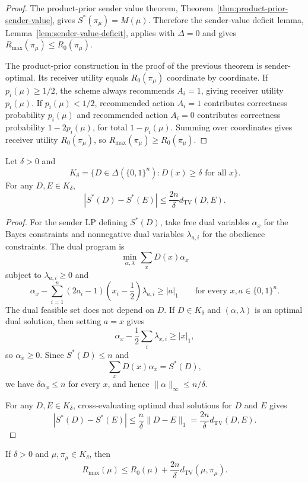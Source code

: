 \documentclass[format=acmsmall, review=false]{acmart}
\newcommand{\TV}{d_{\mathrm{TV}}}
\begin{document}
\begin{proof}
The product-prior sender value theorem,
Theorem~\ref{thm:product-prior-sender-value}, gives
$S^*(\pi_\mu)=M(\mu)$. Therefore the sender-value deficit lemma,
Lemma~\ref{lem:sender-value-deficit}, applies with $\Delta=0$ and gives
$R_{\max}(\pi_\mu)\leq R_0(\pi_\mu)$.

The product-prior construction in the proof of the previous theorem is
sender-optimal. Its receiver utility equals $R_0(\pi_\mu)$ coordinate by
coordinate. If $p_i(\mu)\geq 1/2$, the scheme always recommends $A_i=1$, giving
receiver utility $p_i(\mu)$. If $p_i(\mu)<1/2$, recommended action $A_i=1$
contributes correctness probability $p_i(\mu)$ and recommended action $A_i=0$
contributes correctness probability $1-2p_i(\mu)$, for total
$1-p_i(\mu)$. Summing over coordinates gives receiver utility $R_0(\pi_\mu)$,
so $R_{\max}(\pi_\mu)\geq R_0(\pi_\mu)$.
\end{proof}

\begin{lemma}
\label{lem:sender-value-lipschitz}
Let $\delta>0$ and
\[
K_\delta=\{D\in\Delta(\{0,1\}^n):D(x)\geq \delta\text{ for all }x\}.
\]
For any $D,E\in K_\delta$,
\[
|S^*(D)-S^*(E)|
\leq
\frac{2n}{\delta}\TV(D,E).
\]
\end{lemma}

\begin{proof}
For the sender LP defining $S^*(D)$, take free dual variables $\alpha_x$ for
the Bayes constraints and nonnegative dual variables $\lambda_{a,i}$ for the
obedience constraints. The dual program is
\[
\min_{\alpha,\lambda} \sum_x D(x)\alpha_x
\]
subject to $\lambda_{a,i}\geq 0$ and
\[
\alpha_x-\sum_{i=1}^n (2a_i-1)\left(x_i-\frac12\right)\lambda_{a,i}
\geq |a|_1
\qquad\text{for every }x,a\in\{0,1\}^n.
\]
The dual feasible set does not depend on $D$. If $D\in K_\delta$ and
$(\alpha,\lambda)$ is an optimal dual solution, then setting $a=x$ gives
\[
\alpha_x-\frac12\sum_i\lambda_{x,i}\geq |x|_1,
\]
so $\alpha_x\geq 0$. Since $S^*(D)\leq n$ and
\[
\sum_x D(x)\alpha_x=S^*(D),
\]
we have $\delta\alpha_x\leq n$ for every $x$, and hence
$\|\alpha\|_\infty\leq n/\delta$.

For any $D,E\in K_\delta$, cross-evaluating optimal dual solutions for $D$ and
$E$ gives
\[
|S^*(D)-S^*(E)|
\leq
\frac{n}{\delta}\|D-E\|_1
=
\frac{2n}{\delta}\TV(D,E).
\]
\end{proof}

\begin{corollary}
\label{cor:tv-stability}
If $\delta>0$ and $\mu,\pi_\mu\in K_\delta$, then
\[
R_{\max}(\mu)
\leq
R_0(\mu)+\frac{2n}{\delta}\TV(\mu,\pi_\mu).
\]
\end{corollary}
\end{document}
